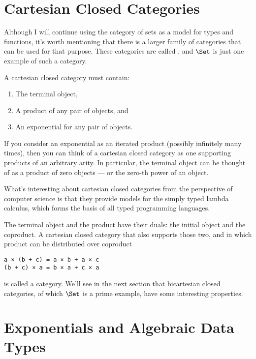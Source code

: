 \section{Cartesian Closed
Categories}\label{cartesian-closed-categories}

Although I will continue using the category of sets as a model for types
and functions, it's worth mentioning that there is a larger family of
categories that can be used for that purpose. These categories are
called , and $\Set$ is just one example of
such a category.

A cartesian closed category must contain:

\begin{enumerate}
\tightlist
\item
  The terminal object,
\item
  A product of any pair of objects, and
\item
  An exponential for any pair of objects.
\end{enumerate}
If you consider an exponential as an iterated product (possibly
infinitely many times), then you can think of a cartesian closed
category as one supporting products of an arbitrary arity. In
particular, the terminal object can be thought of as a product of zero
objects --- or the zero-th power of an object.

What's interesting about cartesian closed categories from the
perspective of computer science is that they provide models for the
simply typed lambda calculus, which forms the basis of all typed
programming languages.

The terminal object and the product have their duals: the initial object
and the coproduct. A cartesian closed category that also supports those
two, and in which product can be distributed over coproduct

\begin{Verbatim}[commandchars=\\\{\}]
a × (b + c) = a × b + a × c
(b + c) × a = b × a + c × a
\end{Verbatim}
is called a  category. We'll see in the next
section that bicartesian closed categories, of which $\Set$ is a
prime example, have some interesting properties.

\section{Exponentials and Algebraic Data
Types}\label{exponentials-and-algebraic-data-types}

